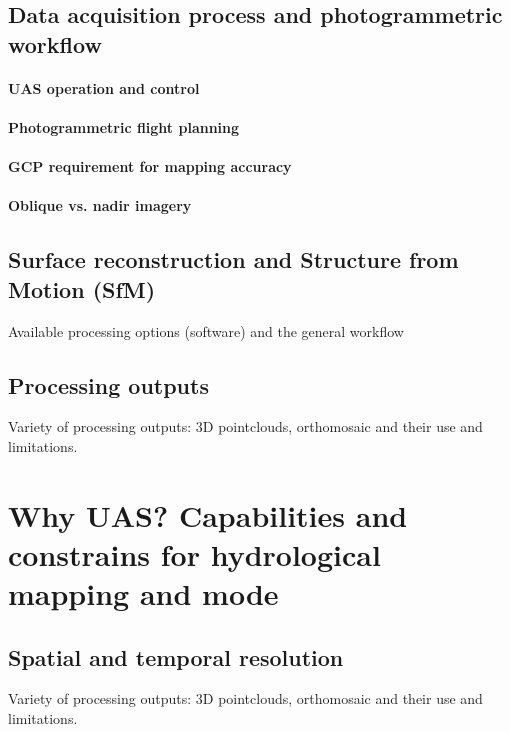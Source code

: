 \documentclass[final,3p,times,twocolumn]{elsarticle}
\begin{document}
\subsection{Data acquisition process and photogrammetric workflow}
\paragraph{UAS operation and control}
\paragraph{Photogrammetric flight planning}
\paragraph{GCP requirement for mapping accuracy}
\paragraph{Oblique vs. nadir imagery}
\subsection{Surface reconstruction and Structure from Motion (SfM)}
Available processing options (software) and the general workflow
\subsection{Processing outputs}
Variety of processing outputs: 3D pointclouds, orthomosaic and their use and limitations. 





\section{Why UAS? Capabilities and constrains for hydrological mapping and mode} \label{WhyUAS}
\subsection{Spatial and temporal resolution}
Variety of processing outputs: 3D pointclouds, orthomosaic and their use and limitations. 
\end{document}
